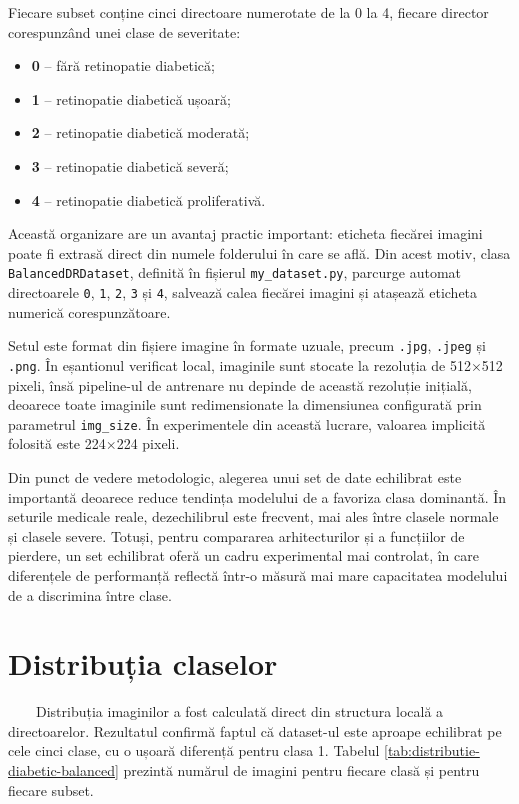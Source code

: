 \documentclass[12pt, a4paper, oneside, romanian]{teza-upb}
\begin{document}
Fiecare subset conține cinci directoare numerotate de la 0 la 4, fiecare director corespunzând unei clase de severitate:

\begin{itemize}
  \item \textbf{0} -- fără retinopatie diabetică;
  \item \textbf{1} -- retinopatie diabetică ușoară;
  \item \textbf{2} -- retinopatie diabetică moderată;
  \item \textbf{3} -- retinopatie diabetică severă;
  \item \textbf{4} -- retinopatie diabetică proliferativă.
\end{itemize}

Această organizare are un avantaj practic important: eticheta fiecărei imagini poate fi extrasă direct din numele folderului în care se află. Din acest motiv, clasa \texttt{BalancedDRDataset}, definită în fișierul \texttt{my\_dataset.py}, parcurge automat directoarele \texttt{0}, \texttt{1}, \texttt{2}, \texttt{3} și \texttt{4}, salvează calea fiecărei imagini și atașează eticheta numerică corespunzătoare.
\bigskip

Setul este format din fișiere imagine în formate uzuale, precum \texttt{.jpg}, \texttt{.jpeg} și \texttt{.png}. În eșantionul verificat local, imaginile sunt stocate la rezoluția de 512$\times$512 pixeli, însă pipeline-ul de antrenare nu depinde de această rezoluție inițială, deoarece toate imaginile sunt redimensionate la dimensiunea configurată prin parametrul \texttt{img\_size}. În experimentele din această lucrare, valoarea implicită folosită este 224$\times$224 pixeli.
\bigskip

Din punct de vedere metodologic, alegerea unui set de date echilibrat este importantă deoarece reduce tendința modelului de a favoriza clasa dominantă. În seturile medicale reale, dezechilibrul este frecvent, mai ales între clasele normale și clasele severe. Totuși, pentru compararea arhitecturilor și a funcțiilor de pierdere, un set echilibrat oferă un cadru experimental mai controlat, în care diferențele de performanță reflectă într-o măsură mai mare capacitatea modelului de a discrimina între clase.

\section{Distribuția claselor}

\ \ \ \ Distribuția imaginilor a fost calculată direct din structura locală a directoarelor. Rezultatul confirmă faptul că dataset-ul este aproape echilibrat pe cele cinci clase, cu o ușoară diferență pentru clasa 1. Tabelul \ref{tab:distributie-diabetic-balanced} prezintă numărul de imagini pentru fiecare clasă și pentru fiecare subset.
\end{document}
